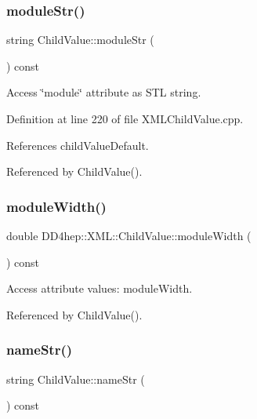 \subsubsection{\texorpdfstring{module\+Str()}{moduleStr()}}
{\footnotesize\ttfamily string Child\+Value\+::module\+Str (\begin{DoxyParamCaption}{ }\end{DoxyParamCaption}) const}



Access \char`\"{}module\char`\"{} attribute as S\+TL string. 



Definition at line 220 of file X\+M\+L\+Child\+Value.\+cpp.



References child\+Value\+Default.



Referenced by Child\+Value().

\hypertarget{struct_d_d4hep_1_1_x_m_l_1_1_child_value_a8c5322e4bfb7e568a109ec5c08bfa8e9}{}\label{struct_d_d4hep_1_1_x_m_l_1_1_child_value_a8c5322e4bfb7e568a109ec5c08bfa8e9} 
\subsubsection{\texorpdfstring{module\+Width()}{moduleWidth()}}
{\footnotesize\ttfamily double D\+D4hep\+::\+X\+M\+L\+::\+Child\+Value\+::module\+Width (\begin{DoxyParamCaption}{ }\end{DoxyParamCaption}) const}



Access attribute values\+: module\+Width. 



Referenced by Child\+Value().

\hypertarget{struct_d_d4hep_1_1_x_m_l_1_1_child_value_acf59342e9514f92c43b479650000e767}{}\label{struct_d_d4hep_1_1_x_m_l_1_1_child_value_acf59342e9514f92c43b479650000e767} 
\subsubsection{\texorpdfstring{name\+Str()}{nameStr()}}
{\footnotesize\ttfamily string Child\+Value\+::name\+Str (\begin{DoxyParamCaption}{ }\end{DoxyParamCaption}) const}



